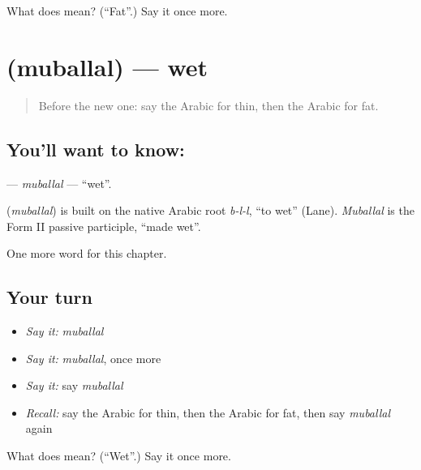 \begin{tcolorbox}[breakable,colback=teal!4,colframe=teal!35!black,title={Before you move on}]
What does  mean? (\textquotedblleft{}Fat\textquotedblright{}.) Say it once more.
\end{tcolorbox}
\section[\texorpdfstring{\ar{مبلل} (muballal)}{مبلل (muballal)}]{ (muballal) — wet}

\label{lesson:AR-C151-muballal}



\begin{quote}
Before the new one: say the Arabic for thin, then the Arabic for fat.
\end{quote}

\subsection*{You'll want to know: }
\textbf{} — \emph{muballal} — \textquotedblleft{}wet\textquotedblright{}.

\begin{cousinweb}
\textbf{} (\emph{muballal}) is built on the native Arabic root \emph{b-l-l}, \textquotedblleft{}to wet\textquotedblright{} (Lane). \emph{Muballal} is the Form II passive participle, \textquotedblleft{}made wet\textquotedblright{}.
\end{cousinweb}

\begin{grammarlens}[title={What you've built}]
One more word for this chapter.
\end{grammarlens}

\subsection*{Your turn}
\begin{itemize}
\raggedright
  \item \emph{Say it:} \emph{muballal}
  \item \emph{Say it:} \emph{muballal}, once more
  \item \emph{Say it:} say \emph{muballal}
  \item \emph{Recall:} say the Arabic for thin, then the Arabic for fat, then say \emph{muballal} again
\end{itemize}

\begin{tcolorbox}[breakable,colback=teal!4,colframe=teal!35!black,title={Before you move on}]
What does  mean? (\textquotedblleft{}Wet\textquotedblright{}.) Say it once more.
\end{tcolorbox}
